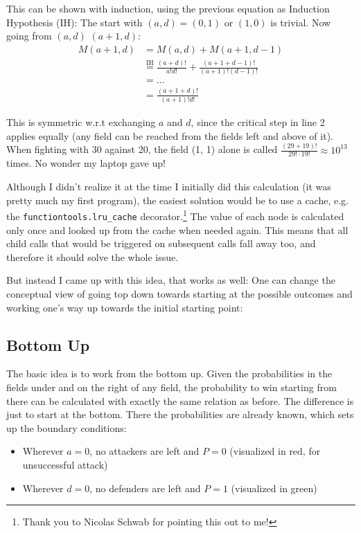 \documentclass[11pt,a4paper]{article}
\begin{document}
    This can be shown with induction, using the previous equation as Induction Hypothesis (IH):
    The start with $(a, d) = (0, 1)$ or $(1, 0)$ is trivial.
    Now going from $(a, d)$ $(a+1, d)$:
    \[ \begin{aligned}
           M(a+1, d) & = M(a, d) + M(a+1, d-1) \\ & \overset{\mathrm{IH}}{=} \frac{(a + d)!}{a! d!} + \frac{(a+1 + d-1)!}{(a+1)! (d-1)!} \\ & = \ldots \\ & = \frac{(a+1 + d)!}{(a+1)! d!}
    \end{aligned} \]

    This is symmetric w.r.t exchanging $a$ and $d$, since the critical step in line 2 applies equally (any field can be reached from the fields left and above of it).
    When fighting with 30 against 20, the field (1, 1) alone is called $\frac{(29 + 19)!}{29! \cdot 19!} \approx 10^{13}$ times.
    No wonder my laptop gave up!

    Although I didn't realize it at the time I initially did this calculation (it was pretty much my first program), the easiest solution would be to use a cache, e.g. the \texttt{functiontools.lru\_cache} decorator.\footnote{Thank you to Nicolas Schwab for pointing this out to me!}
    The value of each node is calculated only once and looked up from the cache when needed again.
    This means that all child calls that would be triggered on subsequent calls fall away too, and therefore it should solve the whole issue.

    But instead I came up with this idea, that works as well:
    One can change the conceptual view of going top down towards starting at the possible outcomes and working one's way up towards the initial starting point:

    \subsection{Bottom Up}
    The basic idea is to work from the bottom up.
    Given the probabilities in the fields under and on the right of any field, the probability to win starting from there can be calculated with exactly the same relation as before.
    The difference is just to start at the bottom.
    There the probabilities are already known, which sets up the boundary conditions:

    \begin{itemize}
        \item Wherever $a=0$, no attackers are left and $P=0$ (visualized in red, for unsuccessful attack)
        \item Wherever $d=0$, no defenders are left and $P=1$ (visualized in green)
    \end{itemize}
\end{document}
